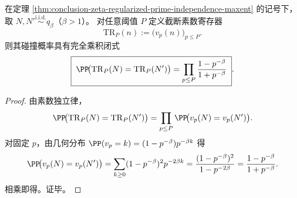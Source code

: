\begin{theorem}[截断素数寄存器的碰撞概率闭式]\label{thm:conclusion-truncated-prime-register-collision-product}
在定理 \ref{thm:conclusion-zeta-regularized-prime-independence-maxent} 的记号下，取 \(N,N'\overset{\mathrm{i.i.d.}}{\sim}q_\beta\)（\(\beta>1\)）。
对任意阈值 \(P\) 定义截断素数寄存器
\[
\mathrm{TR}_P(n):=\bigl(v_p(n)\bigr)_{p\le P}.
\]
则其碰撞概率具有完全乘积闭式
\[
\boxed{\;
\PP\!\bigl(\mathrm{TR}_P(N)=\mathrm{TR}_P(N')\bigr)
=\prod_{p\le P}\frac{1-p^{-\beta}}{1+p^{-\beta}}\; }.
\]
\end{theorem}
\begin{proof}
由素数独立律，
\[
\PP\!\bigl(\mathrm{TR}_P(N)=\mathrm{TR}_P(N')\bigr)
=\prod_{p\le P}\PP\!\bigl(v_p(N)=v_p(N')\bigr).
\]
对固定 \(p\)，由几何分布 \(\PP(v_p=k)=(1-p^{-\beta})p^{-\beta k}\) 得
\[
\PP\!\bigl(v_p(N)=v_p(N')\bigr)
=\sum_{k\ge 0}(1-p^{-\beta})^2p^{-2\beta k}
=\frac{(1-p^{-\beta})^2}{1-p^{-2\beta}}
=\frac{1-p^{-\beta}}{1+p^{-\beta}}.
\]
相乘即得。证毕。
\end{proof}

